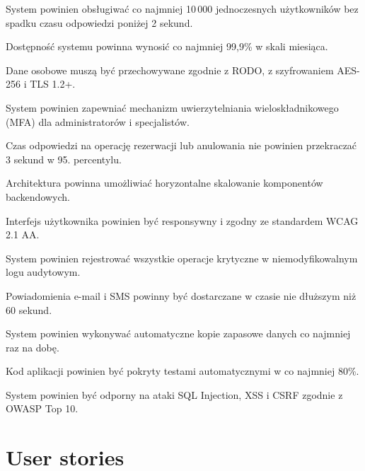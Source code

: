 \documentclass[12pt,a4paper]{article}
\begin{document}
\begin{description}[leftmargin=1.8cm, labelwidth=1.3cm, labelsep=0.5cm, style=nextline]
  \item[NFR1] System powinien obsługiwać co najmniej 10\,000 jednoczesnych użytkowników bez spadku czasu odpowiedzi poniżej 2 sekund.
  \item[NFR2] Dostępność systemu powinna wynosić co najmniej 99,9\% w skali miesiąca.
  \item[NFR3] Dane osobowe muszą być przechowywane zgodnie z RODO, z szyfrowaniem AES-256 i TLS 1.2+.
  \item[NFR4] System powinien zapewniać mechanizm uwierzytelniania wieloskładnikowego (MFA) dla administratorów i specjalistów.
  \item[NFR5] Czas odpowiedzi na operację rezerwacji lub anulowania nie powinien przekraczać 3 sekund w 95. percentylu.
  \item[NFR6] Architektura powinna umożliwiać horyzontalne skalowanie komponentów backendowych.
  \item[NFR7] Interfejs użytkownika powinien być responsywny i zgodny ze standardem WCAG 2.1 AA.
  \item[NFR8] System powinien rejestrować wszystkie operacje krytyczne w niemodyfikowalnym logu audytowym.
  \item[NFR9] Powiadomienia e-mail i SMS powinny być dostarczane w czasie nie dłuższym niż 60 sekund.
  \item[NFR10] System powinien wykonywać automatyczne kopie zapasowe danych co najmniej raz na dobę.
  \item[NFR11] Kod aplikacji powinien być pokryty testami automatycznymi w co najmniej 80\%.
  \item[NFR12] System powinien być odporny na ataki SQL Injection, XSS i CSRF zgodnie z OWASP Top 10.
\end{description}

\section{User stories}
\end{document}
